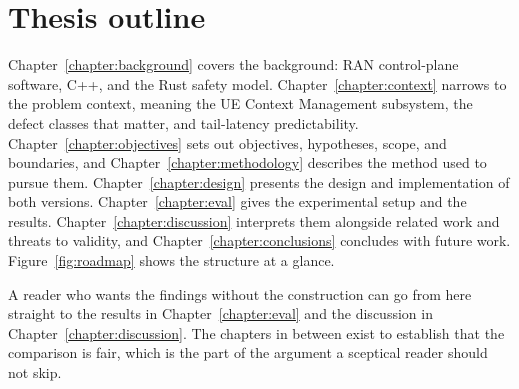 \documentclass[english,twoside,openright,a4paper,censored,csm,software-track-2020]{HYthesisML}
\begin{document}
\section{Thesis outline}
Chapter~\ref{chapter:background} covers the background: RAN control-plane software, C++, and
the Rust safety model. Chapter~\ref{chapter:context} narrows to the problem context, meaning
the UE Context Management subsystem, the defect classes that matter, and tail-latency
predictability. Chapter~\ref{chapter:objectives} sets out objectives, hypotheses, scope, and
boundaries, and Chapter~\ref{chapter:methodology} describes the method used to pursue them.
Chapter~\ref{chapter:design} presents the design and implementation of both versions.
Chapter~\ref{chapter:eval} gives the experimental setup and the results.
Chapter~\ref{chapter:discussion} interprets them alongside related work and threats to
validity, and Chapter~\ref{chapter:conclusions} concludes with future work.
Figure~\ref{fig:roadmap} shows the structure at a glance.

A reader who wants the findings without the construction can go from here straight to the
results in Chapter~\ref{chapter:eval} and the discussion in Chapter~\ref{chapter:discussion}.
The chapters in between exist to establish that the comparison is fair, which is the part of
the argument a sceptical reader should not skip.
\end{document}
